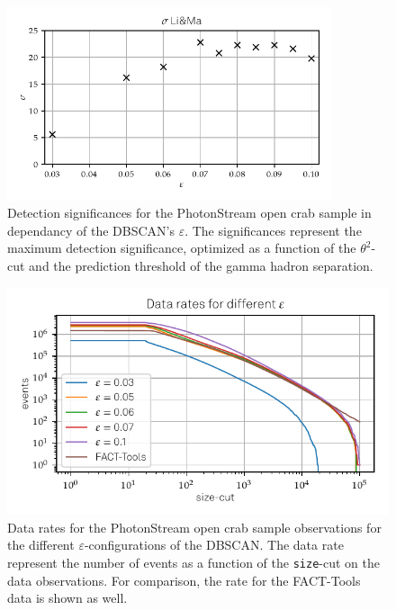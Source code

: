 %
\begin{figure}
  \centering
  \includegraphics[width=0.85\textwidth]{Plots/Epsilon/eps_sigma.pdf}
  \caption{Detection significances for the PhotonStream open crab sample in dependancy of the DBSCAN's $\varepsilon$. The significances represent the maximum detection significance, optimized as a function of the $\theta^2$-cut and the prediction threshold of the gamma hadron separation.}
  \label{fig:eps_sigma}
\end{figure}
%
%
\begin{figure}
  \centering
  \includegraphics[width=\textwidth]{Plots/data_rates_eps.pdf}
  \caption{Data rates for the PhotonStream open crab sample observations for the different $\varepsilon$-configurations of the DBSCAN. The data rate represent the number of events as a function of the \texttt{size}-cut on the data observations. For comparison, the rate for the FACT-Tools data is shown as well.}
  \label{fig:eps_rate}
\end{figure}
%
